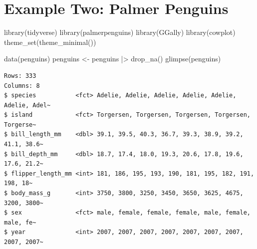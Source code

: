 \documentclass[
  letterpaper,
  DIV=11,
  numbers=noendperiod]{scrreprt}
\newenvironment{Shaded}{\begin{snugshade}}{\end{snugshade}}
\newcommand{\FunctionTok}[1]{\textcolor[rgb]{0.28,0.35,0.67}{#1}}
\newcommand{\NormalTok}[1]{\textcolor[rgb]{0.00,0.23,0.31}{#1}}
\newcommand{\OtherTok}[1]{\textcolor[rgb]{0.00,0.23,0.31}{#1}}
\newcommand{\SpecialCharTok}[1]{\textcolor[rgb]{0.37,0.37,0.37}{#1}}
\begin{document}
\section{Example Two: Palmer
Penguins}\label{example-two-palmer-penguins}

\begin{Shaded}
\begin{Highlighting}[]
\FunctionTok{library}\NormalTok{(tidyverse)}
\FunctionTok{library}\NormalTok{(palmerpenguins)}
\FunctionTok{library}\NormalTok{(GGally)}
\FunctionTok{library}\NormalTok{(cowplot)}
\FunctionTok{theme\_set}\NormalTok{(}\FunctionTok{theme\_minimal}\NormalTok{())}
\end{Highlighting}
\end{Shaded}

\begin{Shaded}
\begin{Highlighting}[]
\FunctionTok{data}\NormalTok{(penguins)}
\NormalTok{penguins }\OtherTok{\textless{}{-}}\NormalTok{ penguins }\SpecialCharTok{|\textgreater{}} \FunctionTok{drop\_na}\NormalTok{()}
\FunctionTok{glimpse}\NormalTok{(penguins)}
\end{Highlighting}
\end{Shaded}

\begin{verbatim}
Rows: 333
Columns: 8
$ species           <fct> Adelie, Adelie, Adelie, Adelie, Adelie, Adelie, Adel~
$ island            <fct> Torgersen, Torgersen, Torgersen, Torgersen, Torgerse~
$ bill_length_mm    <dbl> 39.1, 39.5, 40.3, 36.7, 39.3, 38.9, 39.2, 41.1, 38.6~
$ bill_depth_mm     <dbl> 18.7, 17.4, 18.0, 19.3, 20.6, 17.8, 19.6, 17.6, 21.2~
$ flipper_length_mm <int> 181, 186, 195, 193, 190, 181, 195, 182, 191, 198, 18~
$ body_mass_g       <int> 3750, 3800, 3250, 3450, 3650, 3625, 4675, 3200, 3800~
$ sex               <fct> male, female, female, female, male, female, male, fe~
$ year              <int> 2007, 2007, 2007, 2007, 2007, 2007, 2007, 2007, 2007~
\end{verbatim}
\end{document}
